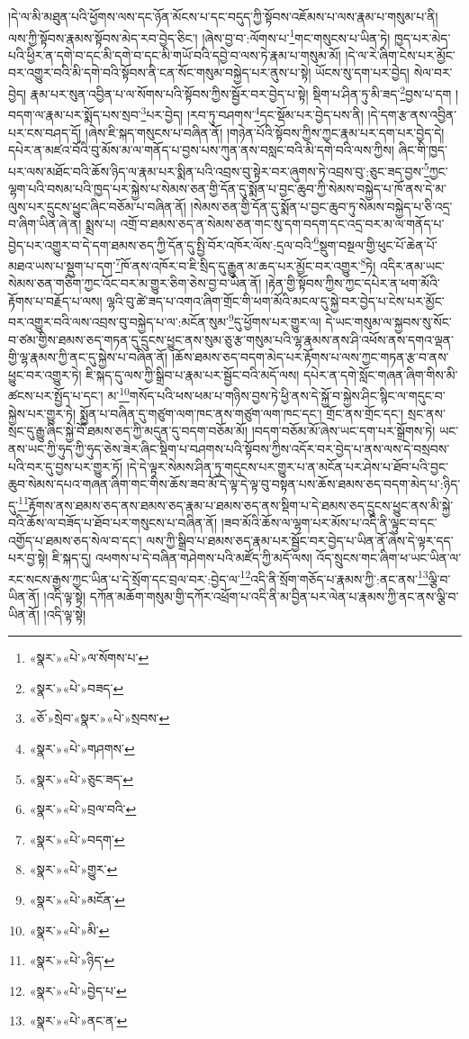 །དེ་ལ་མི་མཐུན་པའི་ཕྱོགས་ལས་དང་ཉོན་མོངས་པ་དང་བདུད་ཀྱི་སྟོབས་འཇོམས་པ་ལས་རྣམ་པ་གསུམ་པ་ནི། ལས་ཀྱི་སྟོབས་རྣམས་སྟོབས་མེད་རབ་བྱེད་ཅིང་། །ཞེས་བྱ་བ་:ལོགས་པ་\footnote{«སྣར་»«པེ་»ལ་སོགས་པ་}གང་གསུངས་པ་ཡིན་ཏེ། ཁྱད་པར་མེད་པའི་ཕྱིར་ན་དགེ་བ་དང་མི་དགེ་བ་དང་མི་གཡོ་བའི་དབྱེ་བ་ལས་ཏེ་རྣམ་པ་གསུམ་མོ། །དེ་ལ་རེ་ཞིག་ངེས་པར་མྱོང་བར་འགྱུར་བའི་མི་དགེ་བའི་སྟོབས་ནི་ངན་སོང་གསུམ་བསྐྱེད་པར་ནུས་པ་སྟེ། ཡོངས་སུ་དག་པར་བྱེད། སེལ་བར་བྱེད། རྣམ་པར་སུན་འབྱིན་པ་ལ་སོགས་པའི་སྟོབས་ཀྱིས་སྦྱོར་བར་བྱེད་པ་སྟེ། སྡིག་པ་ཤིན་ཏུ་མི་ཟད་\footnote{«སྣར་»«པེ་»བཟད་}བྱས་པ་དག །བདག་ལ་རྣམ་པར་སྨོད་པས་སྲབ་\footnote{«ཅོ་»སྲེབ་«སྣར་»«པེ་»སྲབས་}པར་བྱེད། །རབ་ཏུ་བཤགས་\footnote{«སྣར་»«པེ་»གཤགས་}དང་སྡོམ་པར་བྱེད་པས་ནི། །དེ་དག་རྩ་ནས་འབྱིན་པར་ངས་བཤད་དོ། །ཞེས་ཇི་སྐད་གསུངས་པ་བཞིན་ནོ། །གཉེན་པོའི་སྟོབས་ཀྱིས་ཀྱང་རྣམ་པར་དག་པར་བྱེད་དེ། དཔེར་ན་མཛའ་བོའི་བུ་མོས་མ་ལ་གནོད་པ་བྱས་པས་ཀུན་ནས་བསླང་བའི་མི་དགེ་བའི་ལས་ཀྱིས། ཞིང་གི་ཁྱད་པར་ལས་མཐོང་བའི་ཆོས་ཉིད་ལ་རྣམ་པར་སྨིན་པའི་འབྲས་བུ་སྟེར་བར་ཞུགས་ཏེ་འབྲས་བུ་:ཅུང་ཟད་བྱས་\footnote{«སྣར་»«པེ་»ཅུང་ཟད་}ཀྱང་ལྷག་པའི་བསམ་པའི་ཁྱད་པར་སྐྱེས་པ་སེམས་ཅན་གྱི་དོན་དུ་སྨོན་པ་བྱང་ཆུབ་ཀྱི་སེམས་བསྐྱེད་པ་ཁོ་ནས་དེ་མ་ལུས་པར་དྲུངས་ཕྱུང་ཞིང་བཅོམ་པ་བཞིན་ནོ། །སེམས་ཅན་གྱི་དོན་དུ་སྨོན་པ་བྱང་ཆུབ་ཏུ་སེམས་བསྐྱེད་པ་ཅི་འདྲ་བ་ཞིག་ཡིན་ཞེ་ན། སྨྲས་པ། འགྲོ་བ་ཐམས་ཅད་ན་སེམས་ཅན་གང་སུ་དག་བདག་དང་འདྲ་བར་མ་ལ་གནོད་པ་བྱེད་པར་འགྱུར་བ་དེ་དག་ཐམས་ཅད་ཀྱི་དོན་དུ་སྤྱི་བོར་འཁོར་ལོས་:དྲལ་བའི་\footnote{«སྣར་»«པེ་»བྲལ་བའི་}སྡུག་བསྔལ་གྱི་ཕུང་པོ་ཆེན་པོ་མཐའ་ཡས་པ་སྡུག་པ་དག་\footnote{«སྣར་»«པེ་»བདག་}ཁོ་ནས་འཁོར་བ་ཇི་སྲིད་དུ་རྒྱུན་མ་ཆད་པར་མྱོང་བར་འགྱུར་\footnote{«སྣར་»«པེ་»གྱུར་}ཏེ། འདིར་ནམ་ཡང་སེམས་ཅན་གཅིག་ཀྱང་འོང་བར་མ་གྱུར་ཅིག་ཅེས་བྱ་བ་ཡིན་ནོ། །རྟེན་གྱི་སྟོབས་ཀྱིས་ཀྱང་དཔེར་ན་ཕག་མོའི་རྟོགས་པ་བརྗོད་པ་ལས། ལྷའི་བུ་ཚེ་ཟད་པ་འགའ་ཞིག་གྲོང་གི་ཕག་མོའི་མངལ་དུ་སྐྱེ་བར་བྱེད་པ་ངེས་པར་མྱོང་བར་འགྱུར་བའི་ལས་འབྲས་བུ་བསྐྱེད་པ་ལ་:མངོན་སུམ་\footnote{«སྣར་»«པེ་»མངོན་}དུ་ཕྱོགས་པར་གྱུར་ལ། དེ་ཡང་གསུམ་ལ་སྐྱབས་སུ་སོང་བ་ཙམ་གྱིས་ཐམས་ཅད་གཏན་དུ་དྲུངས་ཕྱུང་ནས་སུམ་ཅུ་རྩ་གསུམ་པའི་ལྷ་རྣམས་ནས་ཤི་འཕོས་ནས་དགའ་ལྡན་གྱི་ལྷ་རྣམས་ཀྱི་ནང་དུ་སྐྱེས་པ་བཞིན་ནོ། །ཆོས་ཐམས་ཅད་བདག་མེད་པར་རྟོགས་པ་ལས་ཀྱང་གཏན་རྩ་བ་ནས་ཕྱུང་བར་འགྱུར་ཏེ། ཇི་སྐད་དུ་ལས་ཀྱི་སྒྲིབ་པ་རྣམ་པར་སྦྱོང་བའི་མདོ་ལས། དཔེར་ན་དགེ་སློང་གཞན་ཞིག་གིས་མི་ཚངས་པར་སྤྱོད་པ་དང་། མ་\footnote{«སྣར་»«པེ་»མི་}གསོད་པའི་ཕས་ཕམ་པ་གཉིས་བྱས་ཏེ་ཕྱི་ནས་དེ་སྐྱོ་བ་སྐྱེས་ཤིང་སྙིང་ལ་གདུང་བ་སྐྱེས་པར་གྱུར་ཏེ། སྨྱོན་པ་བཞིན་དུ་གཙུག་ལག་ཁང་ནས་གཙུག་ལག་ཁང་དང་། གྲོང་ནས་གྲོང་དང་། སྲང་ནས་སྲང་དུ་རྒྱུ་ཞིང་སྐྱེ་བོ་ཐམས་ཅད་ཀྱི་མདུན་དུ་བདག་བཅོམ་མོ། །བདག་བཅོམ་མོ་ཞེས་ཡང་དག་པར་སྒྲོགས་ཏེ། ཡང་ནས་ཡང་ཀྱི་ཧུད་ཀྱི་ཧུད་ཅེས་ཟེར་ཞིང་སྡིག་པ་བཤགས་པའི་སྟོབས་ཀྱིས་འདོར་བར་བྱེད་པ་ནས་ལས་དེ་བསྲབས་པའི་བར་དུ་བྱས་པར་གྱུར་ཏོ། །དེ་དེ་ལྟར་སེམས་ཤིན་ཏུ་གདུངས་པར་གྱུར་པ་ན་མངོན་པར་ཤེས་པ་ཐོབ་པའི་བྱང་ཆུབ་སེམས་དཔའ་གཞན་ཞིག་གང་གིས་ཆོས་ཟབ་མོ་དེ་ལྟ་དེ་ལྟ་བུ་བསྟན་པས་ཆོས་ཐམས་ཅད་བདག་མེད་པ་:ཉིད་དུ་\footnote{«སྣར་»«པེ་»ཉིད་}རྟོགས་ནས་ཐམས་ཅད་ནས་ཐམས་ཅད་རྣམ་པ་ཐམས་ཅད་ནས་སྡིག་པ་དེ་ཐམས་ཅད་དྲུངས་ཕྱུང་ནས་མི་སྐྱེ་བའི་ཆོས་ལ་བཟོད་པ་ཐོབ་པར་གསུངས་པ་བཞིན་ནོ། །ཟབ་མོའི་ཆོས་ལ་ལྷག་པར་མོས་པ་འདི་ནི་ལྟུང་བ་དང་འགྱོད་པ་ཐམས་ཅད་སེལ་བ་དང་། ལས་ཀྱི་སྒྲིབ་པ་ཐམས་ཅད་རྣམ་པར་སྦྱོང་བར་བྱེད་པ་ཡིན་ནོ་ཞེས་དེ་ལྟར་དད་པར་བྱ་སྟེ། ཇི་སྐད་དུ། འཕགས་པ་དེ་བཞིན་གཤེགས་པའི་མཛོད་ཀྱི་མདོ་ལས། འོད་སྲུངས་གང་ཞིག་ཕ་ཡང་ཡིན་ལ་རང་སངས་རྒྱས་ཀྱང་ཡིན་པ་དེ་སྲོག་དང་བྲལ་བར་:བྱེད་ལ་\footnote{«སྣར་»«པེ་»བྱེད་པ་}འདི་ནི་སྲོག་གཅོད་པ་རྣམས་ཀྱི་:ནང་ནས་\footnote{«སྣར་»«པེ་»ནང་ན་}ལྕི་བ་ཡིན་ནོ། །འདི་ལྟ་སྟེ། དཀོན་མཆོག་གསུམ་གྱི་དཀོར་འཕྲོག་པ་འདི་ནི་མ་བྱིན་པར་ལེན་པ་རྣམས་ཀྱི་ནང་ནས་ལྕི་བ་ཡིན་ནོ། །འདི་ལྟ་སྟེ། 